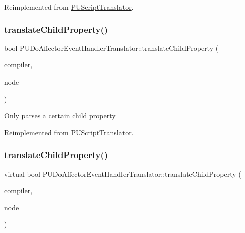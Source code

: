 Reimplemented from \hyperlink{classPUScriptTranslator_ab587d01348ae3e678cb700c719b2b113}{P\+U\+Script\+Translator}.

\mbox{\label{classPUDoAffectorEventHandlerTranslator_a12b5d798baf70e745568ee863ee34115}} 
\subsubsection{\texorpdfstring{translate\+Child\+Property()}{translateChildProperty()}\hspace{0.1cm}{\footnotesize\ttfamily [1/2]}}
{\footnotesize\ttfamily bool P\+U\+Do\+Affector\+Event\+Handler\+Translator\+::translate\+Child\+Property (\begin{DoxyParamCaption}\item[{\hyperlink{classPUScriptCompiler}{P\+U\+Script\+Compiler} $\ast$}]{compiler,  }\item[{\hyperlink{classPUAbstractNode}{P\+U\+Abstract\+Node} $\ast$}]{node }\end{DoxyParamCaption})\hspace{0.3cm}{\ttfamily [virtual]}}

Only parses a certain child property 

Reimplemented from \hyperlink{classPUScriptTranslator_a0374d83a8a04e57918975d525e0f8fe8}{P\+U\+Script\+Translator}.

\mbox{\label{classPUDoAffectorEventHandlerTranslator_a8288c67c5eb91f03e3c030a954ec2b87}} 
\subsubsection{\texorpdfstring{translate\+Child\+Property()}{translateChildProperty()}\hspace{0.1cm}{\footnotesize\ttfamily [2/2]}}
{\footnotesize\ttfamily virtual bool P\+U\+Do\+Affector\+Event\+Handler\+Translator\+::translate\+Child\+Property (\begin{DoxyParamCaption}\item[{\hyperlink{classPUScriptCompiler}{P\+U\+Script\+Compiler} $\ast$}]{compiler,  }\item[{\hyperlink{classPUAbstractNode}{P\+U\+Abstract\+Node} $\ast$}]{node }\end{DoxyParamCaption})\hspace{0.3cm}{\ttfamily [virtual]}}

